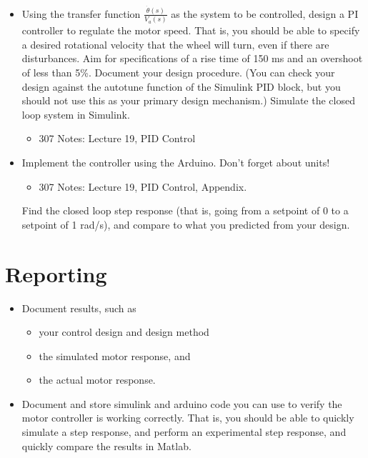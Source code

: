 \begin{itemize}
\begin{center}
\end{center}
\item Using the transfer function $\frac{\dot{\theta}(s)}{V_{a}(s)}$ as the system to be controlled, design a PI controller to regulate the motor speed. That is, you should be able to specify a desired rotational velocity that the wheel will turn, even if there are disturbances. Aim for specifications of a rise time of 150 ms and an overshoot of less than 5\%.  Document your design procedure. (You can check your design against the autotune function of the Simulink PID block, but you should not use this as your primary design mechanism.) Simulate the closed loop system in Simulink.
\begin{itemize}
\item 307 Notes: Lecture 19, PID Control
\end{itemize} 
\item Implement the controller using the Arduino. Don't forget about units! 
\begin{itemize}
\item 307 Notes: Lecture 19, PID Control, Appendix.
\end{itemize}
Find the closed loop step response (that is, going from a setpoint of 0 to a setpoint of 1 rad/s), and compare to what you predicted from your design.







\end{itemize}





\section{Reporting}
\begin{itemize}
\item Document results, such as 
\begin{itemize}
\item your control design and design method
\item the simulated motor response, and 
\item the actual motor response. 
\end{itemize}
\item Document and store simulink and arduino code you can use to verify the motor controller is working correctly. That is, you should be able to quickly simulate a step response, and perform an experimental step response, and quickly compare the results in Matlab.
\end{itemize}
